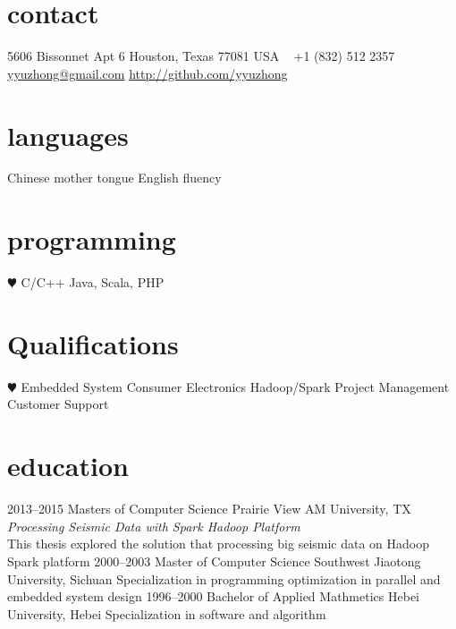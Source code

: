 \documentclass[]{friggeri-cv} %
\begin{document}


\begin{aside} %
\section{contact}
5606 Bissonnet Apt 6
Houston, Texas 77081
USA
~
+1 (832) 512 2357
~
\href{mailto:yyuzhong@gmail.com}{yyuzhong@gmail.com}
\href{http://github.com/yyuzhong}{http://github.com/yyuzhong}
\section{languages}
Chinese mother tongue
English fluency
\section{programming}
{\color{red} $\varheartsuit$} C/C++
Java, Scala, PHP
\section{Qualifications}
{\color{red} $\varheartsuit$} Embedded System
Consumer Electronics
Hadoop/Spark
Project Management
Customer Support
\end{aside}


\section{education}

\begin{entrylist}
\entry
{2013--2015}
{Masters {\normalfont of Computer Science}}
{Prairie View AM University, TX}
{ \emph{Processing Seismic Data with Spark Hadoop Platform} \\ This thesis explored the solution that processing big seismic data on Hadoop Spark platform}
\entry
{2000--2003}
{Master {\normalfont of Computer Science}}
{Southwest Jiaotong University, Sichuan}
{Specialization in programming optimization in parallel and embedded system design}
\entry
{1996--2000}
{Bachelor {\normalfont of Applied Mathmetics}}
{Hebei University, Hebei}
{Specialization in software and algorithm}
\end{entrylist}
\end{document}
